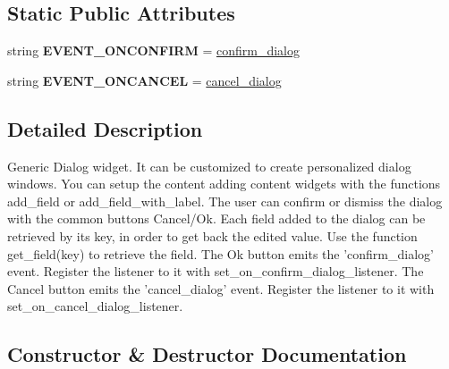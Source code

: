 \subsection*{Static Public Attributes}
\begin{DoxyCompactItemize}
\item 
string {\bfseries E\+V\+E\+N\+T\+\_\+\+O\+N\+C\+O\+N\+F\+I\+RM} = \textquotesingle{}\hyperlink{classremi_1_1gui_1_1GenericDialog_afb62d4e48291115923d9dae74841a989}{confirm\+\_\+dialog}\textquotesingle{}\hypertarget{classremi_1_1gui_1_1GenericDialog_a47b550ba98284580cd6796c9b60b3f88}{}\label{classremi_1_1gui_1_1GenericDialog_a47b550ba98284580cd6796c9b60b3f88}

\item 
string {\bfseries E\+V\+E\+N\+T\+\_\+\+O\+N\+C\+A\+N\+C\+EL} = \textquotesingle{}\hyperlink{classremi_1_1gui_1_1GenericDialog_a23650c8959545f1a4c50b9b375f0412d}{cancel\+\_\+dialog}\textquotesingle{}\hypertarget{classremi_1_1gui_1_1GenericDialog_ac4a70282a547c9decdd92d296946814f}{}\label{classremi_1_1gui_1_1GenericDialog_ac4a70282a547c9decdd92d296946814f}

\end{DoxyCompactItemize}


\subsection{Detailed Description}
\begin{DoxyVerb}Generic Dialog widget. It can be customized to create personalized dialog windows.
You can setup the content adding content widgets with the functions add_field or add_field_with_label.
The user can confirm or dismiss the dialog with the common buttons Cancel/Ok.
Each field added to the dialog can be retrieved by its key, in order to get back the edited value. Use the function
get_field(key) to retrieve the field.
The Ok button emits the 'confirm_dialog' event. Register the listener to it with set_on_confirm_dialog_listener.
The Cancel button emits the 'cancel_dialog' event. Register the listener to it with set_on_cancel_dialog_listener.
\end{DoxyVerb}
 

\subsection{Constructor \& Destructor Documentation}
